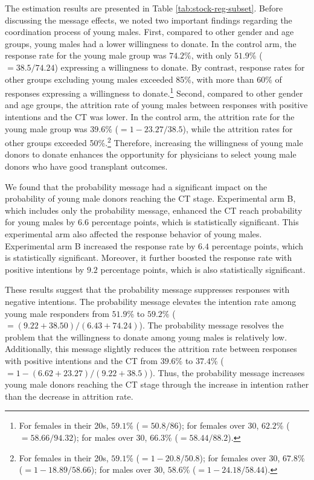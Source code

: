 \documentclass[12pt, a4paper]{article}
\begin{document}
The estimation results are presented in Table \ref{tab:stock-reg-subset}. Before discussing the message effects, we noted two important findings regarding the coordination process of young males. First, compared to other gender and age groups, young males had a lower willingness to donate. In the control arm, the response rate for the young male group was \(74.2\)\%, with only \(51.9\)\% (\(=38.5/74.24\)) expressing a willingness to donate. By contrast, response rates for other groups excluding young males exceeded 85\%, with more than 60\% of responses expressing a willingness to donate.\footnote{For females in their 20s, \(59.1\)\% (\(=50.8/86\)); for females over 30, \(62.2\)\% (\(=58.66/94.32\)); for males over 30, \(66.3\)\% (\(=58.44/88.2\)).} Second, compared to other gender and age groups, the attrition rate of young males between responses with positive intentions and the CT was lower. In the control arm, the attrition rate for the young male group was \(39.6\)\% (\(=1-23.27/38.5\)), while the attrition rates for other groups exceeded 50\%.\footnote{For females in their 20s, \(59.1\)\% (\(=1 - 20.8/50.8\)); for females over 30, \(67.8\)\% (\(=1-18.89/58.66\)); for males over 30, \(58.6\)\% (\(=1-24.18/58.44\)).} Therefore, increasing the willingness of young male donors to donate enhances the opportunity for physicians to select young male donors who have good transplant outcomes.

We found that the probability message had a significant impact on the probability of young male donors reaching the CT stage. Experimental arm B, which includes only the probability message, enhanced the CT reach probability for young males by \(6.6\) percentage points, which is statistically significant. This experimental arm also affected the response behavior of young males. Experimental arm B increased the response rate by \(6.4\) percentage points, which is statistically significant. Moreover, it further boosted the response rate with positive intentions by \(9.2\) percentage points, which is also statistically significant.

These results suggest that the probability message suppresses responses with negative intentions. The probability message elevates the intention rate among young male responders from \(51.9\)\% to \(59.2\)\% (\(=(9.22+38.50)/(6.43+74.24)\)). The probability message resolves the problem that the willingness to donate among young males is relatively low. Additionally, this message slightly reduces the attrition rate between responses with positive intentions and the CT from \(39.6\)\% to \(37.4\)\% (\(=1-(6.62+23.27)/(9.22+38.5)\)). Thus, the probability message increases young male donors reaching the CT stage through the increase in intention rather than the decrease in attrition rate.
\end{document}
